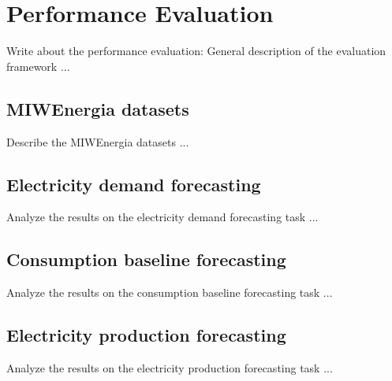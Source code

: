 \chapter{Performance Evaluation}
\label{cha:evaluation}
\vspace{0.4 cm}

Write about the performance evaluation: General description of the evaluation framework ...

\section{MIWEnergia datasets}
\label{sec:datasets}
\vspace{0.2 cm}

Describe the MIWEnergia datasets ...


\section{Electricity demand forecasting}
\label{sec:demandval}
\vspace{0.2 cm}

Analyze the results on the electricity demand forecasting task ...


\section{Consumption baseline forecasting}
\label{sec:baselineval}
\vspace{0.2 cm}

Analyze the results on the consumption baseline forecasting task ...


\section{Electricity production forecasting}
\label{sec:productionval}
\vspace{0.2 cm}

Analyze the results on the electricity production forecasting task ...
